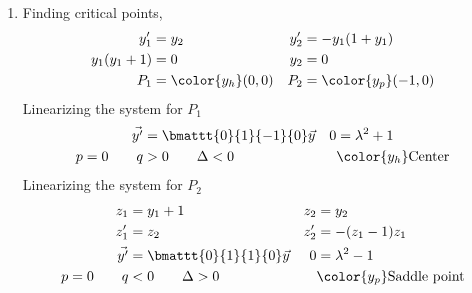 \begin{enumerate}
    \item Finding critical points,
          \begin{align}
              y_1'         & = y_2                 & y_2' & = -y_1(1 + y_1) \\
              y_1(y_1 + 1) & = 0                   & y_2  & = 0             \\
              P_1          & = \color{y_h}(0, 0)   &
              P_2          & = \color{y_p} (-1, 0)
          \end{align}
          Linearizing the system for $ P_1 $
          \begin{align}
              \vec{y'}       & = \bmattt{0}{1}{-1}{0} \vec{y} &
              0              & = \lambda^{2} + 1                \\
              p = 0 \qquad q & > 0 \qquad \Delta < 0          &
                             & \color{y_h} \text{Center}
          \end{align}
          Linearizing the system for $ P_2 $
          \begin{align}
              z_1            & = y_1 + 1                       &
              z_2            & = y_2                             \\
              z_1'           & = z_2                           &
              z_2'           & = -(z_1 - 1)z_1                   \\
              \vec{y'}       & = \bmattt{0}{1}{1}{0} \vec{y}   &
              0              & = \lambda^{2} - 1                 \\
              p = 0 \qquad q & < 0 \qquad \Delta > 0           &
                             & \color{y_p} \text{Saddle point}
          \end{align}


\end{enumerate}
